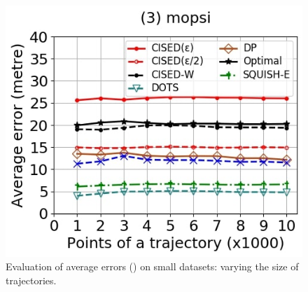 {\begin{figure}[tb!]
	\includegraphics[scale=0.250]{Figures/Exp-SED-error-size-mopsi.jpg}		
	\vspace{-2ex}
	\caption{\small Evaluation of average errors (\sed) on small datasets: varying the size of
		trajectories.}
	\label{fig:ae-sed-size}
	\vspace{-2ex}
\end{figure}


}
